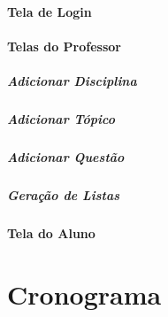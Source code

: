 \documentclass[12pt,oneside,a4paper,article]{abntex2}
\begin{document}
		\subsection{Tela de Login}
	
		\subsection{Telas do Professor}
			\subsubsection{Adicionar Disciplina}
			\subsubsection{Adicionar Tópico}
			\subsubsection{Adicionar Questão}
			\subsubsection{Geração de Listas}
		
		\subsection{Tela do Aluno}
		

\part{Cronograma}
\end{document}
